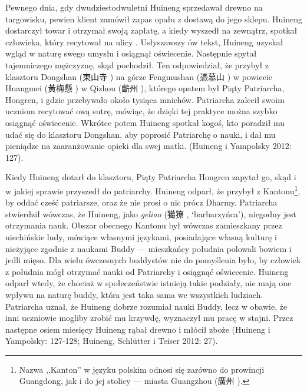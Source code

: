 Pewnego dnia, gdy dwudziestodwuletni Huineng sprzedawał drewno na targowisku, pewien klient zamówił zapas opału z dostawą do jego sklepu.
Huineng dostarczył towar i otrzymał swoją zapłatę, a kiedy wyszedł na zewnątrz, spotkał człowieka, który recytował na ulicy .
Usłyszawszy ów tekst, Huineng uzyskał wgląd w naturę swego umysłu i osiągnął oświecenie. Następnie spytał tajemniczego mężczyznę, skąd pochodził.
Ten odpowiedział, że przybył z klasztoru Dongshan (東山寺 ) na górze Fengmushan (憑墓山 ) w powiecie Huangmei (黃梅懸 ) w Qizhou (蘄州 ), którego opatem był Piąty Patriarcha, Hongren, i gdzie przebywało około tysiąca mnichów.
Patriarcha zalecił swoim uczniom recytować ową sutrę, mówiąc, że dzięki tej praktyce można szybko osiągnąć oświecenie.
Wkrótce potem Huineng spotkał kogoś, kto poradził mu udać się do klasztoru Dongshan, aby poprosić Patriarchę o nauki, i dał mu pieniądze na zaaranżowanie opieki dla swej matki.
(Huineng i Yampolsky 2012: 127).

Kiedy Huineng dotarł do klasztoru, Piąty Patriarcha Hongren zapytał go, skąd i w jakiej sprawie przyszedł do patriarchy.
Huineng odparł, że przybył z Kantonu\footnote{Nazwa ,,Kanton'' w języku polskim odnosi się zarówno do prowincji Guangdong, jak i do jej stolicy --- miasta Guangzhou (廣州 ).}, by oddać cześć patriarsze, oraz że nie prosi o nic prócz Dharmy.
Patriarcha stwierdził wówczas, że Huineng, jako \textit{geliao} (獦獠 , `barbarzyńca'), niegodny jest otrzymania nauk.
Obszar obecnego Kantonu był wówczas zamieszkany przez niechińskie ludy, mówiące własnymi językami, posiadające własną kulturę i nieżyjące zgodnie z naukami Buddy --- mieszkańcy południa polowali bowiem i jedli mięso.
Dla wielu ówczesnych buddystów nie do pomyślenia było, by człowiek z południa mógł otrzymać nauki od Patriarchy i osiągnąć oświecenie.
Huineng odparł wtedy, że chociaż w społeczeństwie istnieją takie podziały, nie mają one wpływu na naturę buddy, która jest taka sama we wszystkich ludziach.
Patriarcha uznał, że Huineng dobrze rozumiał nauki Buddy, lecz w obawie, że inni uczniowie mogliby zrobić mu krzywdę, wyznaczył mu pracę w stajni.
Przez następne osiem miesięcy Huineng rąbał drewno i młócił zboże
(Huineng i Yampolsky: 127-128; Huineng, Schlütter i Teiser 2012: 27).

